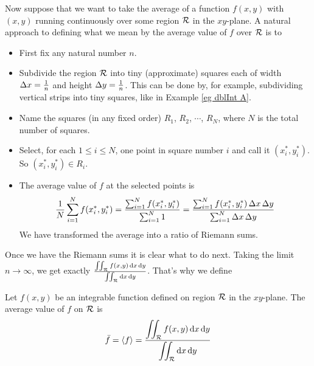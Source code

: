 Now suppose that we want to take the average of a function $f(x,y)$ with 
$(x,y)$ running continuously over some region $\mathcal{R}$ in the $xy$-plane. 
A natural approach to defining what we mean by the average value of $f$
over $\mathcal{R}$ is to
\begin{itemize}
\item
First fix any natural number $n$. 
\item 
Subdivide the region $\mathcal{R}$ into tiny (approximate) squares
each of width $\Delta x=\frac{1}{n}$ and height $\Delta y =\frac{1}{n}$. 
This can be done by, for example, subdividing vertical strips into 
tiny squares, like in Example \ref{eg dblInt A}.
\item
Name the squares (in any fixed order) $R_1$, $R_2$, $\cdots$, $R_N$,
where $N$ is the total number of squares.  
\item
Select, for each $1\le i\le N$, one point in square number $i$ and 
call it $(x_i^*,y_i^*)$. So $(x_i^*,y_i^*)\in R_i$.
\item
The average value of $f$ at the selected points is
\begin{align*}
\frac{1}{N}\sum_{i=1}^N f(x_i^*,y_i^*)
=\frac{\sum_{i=1}^N f(x_i^*,y_i^*)}{{\sum_{i=1}^N 1 }}
=\frac{\sum_{i=1}^N f(x_i^*,y_i^*)\, \Delta x\,\Delta y}{{\sum_{i=1}^N  \Delta x\,\Delta y}}
\end{align*}
We have transformed the average into a ratio of Riemann sums.
\end{itemize}
Once we have the Riemann sums it is clear what to do next.
Taking the limit $n\rightarrow\infty$,
we get exactly $\frac{\iint_{\mathcal{R}} f(x,y)\,\mathrm{d}x\,\mathrm{d}y}
                    {\iint_{\mathcal{R}} \mathrm{d}x\,\mathrm{d}y}$. That's why we define
\begin{defn}\label{def AVaverage}
Let $f(x,y)$ be an integrable function defined on region $\mathcal{R}$ in the
$xy$-plane. The average value of $f$ on $\mathcal{R}$ is
\begin{align*}
\bar f=\left< f\right>
=\frac{\displaystyle\iint_{\mathcal{R}} f(x,y)\,\mathrm{d}x\,\mathrm{d}y}
                       {\displaystyle\iint_{\mathcal{R}} \mathrm{d}x\,\mathrm{d}y}
\end{align*}
\end{defn}




